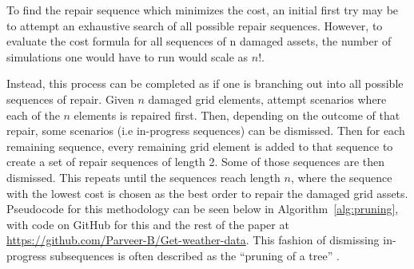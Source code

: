 \documentclass[12pt]{article}
\begin{document}
To find the repair sequence which minimizes the cost, an initial first try may be to attempt an exhaustive search of all possible repair sequences. However, to evaluate the cost formula for all sequences of n damaged assets, the number of simulations one would have to run would scale as $n!$. \par
Instead, this process can be completed as if one is branching out into all possible sequences of repair. Given $n$ damaged grid elements, attempt scenarios where each of the $n$ elements is repaired first. Then, depending on the outcome of that repair, some scenarios (i.e in-progress sequences) can be dismissed. Then for each remaining sequence, every remaining grid element is added to that sequence to create a set of repair sequences of length 2. Some of those sequences are then dismissed. This repeats until the sequences reach length $n$, where the sequence with the lowest cost is chosen as the best order to repair the damaged grid assets. Pseudocode for this methodology can be seen below in Algorithm~\ref{alg:pruning}, with code on GitHub for this and the rest of the paper at \url{https://github.com/Parveer-B/Get-weather-data}. This fashion of dismissing in-progress subsequences is often described as the “pruning of a tree” \cite{morelato}.
\end{document}
